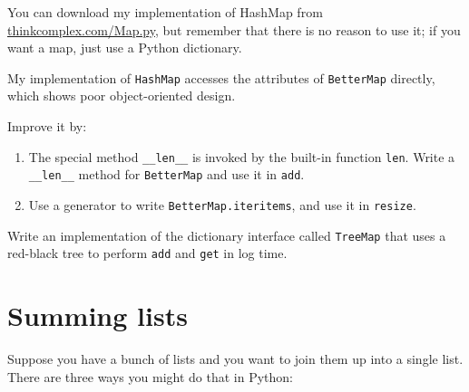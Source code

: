 \documentclass[10pt]{book}
\begin{document}
You can download my implementation of HashMap from
\url{thinkcomplex.com/Map.py}, but remember that there 
is no reason to use it; if you want a map, just use a Python dictionary.

\begin{ex}

My implementation of {\tt HashMap} accesses the attributes of
{\tt BetterMap} directly, which shows poor object-oriented design.

Improve it by:

\begin{enumerate}

\item The special method \verb"__len__" is invoked by the built-in
function {\tt len}.  Write a \verb"__len__" method for {\tt BetterMap}
and use it in {\tt add}.

\item Use a generator to write {\tt BetterMap.iteritems}, and use it
in {\tt resize}.

\end{enumerate}

\end{ex}


\begin{ex}

Write an implementation of the dictionary interface called
{\tt TreeMap} that uses a red-black tree to perform {\tt add}
and {\tt get} in log time.

\end{ex}



\section{Summing lists}

Suppose you have a bunch of lists and you want to join them up
into a single list.  There are three ways you might do that
in Python:
\end{document}
